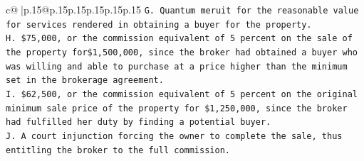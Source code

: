 \documentclass{article}
\begin{document}
{\begin{supertabular}{c@{$\;$}|p{.15\linewidth}@{}p{.15\linewidth}p{.15\linewidth}p{.15\linewidth}p{.15\linewidth}p{.15\linewidth}}
{{{\texttt{G. Quantum meruit for the reasonable value for services rendered in obtaining a buyer for the property.} \\
\texttt{H. \$75,000, or the commission equivalent of 5 percent on the sale of the property for\$1,500,000, since the broker had obtained a buyer who was willing and able to purchase at a price higher than the minimum set in the brokerage agreement.} \\
\texttt{I. \$62,500, or the commission equivalent of 5 percent on the original minimum sale price of the property for \$1,250,000, since the broker had fulfilled her duty by finding a potential buyer.} \\
\texttt{J. A court injunction forcing the owner to complete the sale, thus entitling the broker to the full commission.} \\
            }
        }
    }
     \\ \\


\end{supertabular}}
\end{document}
